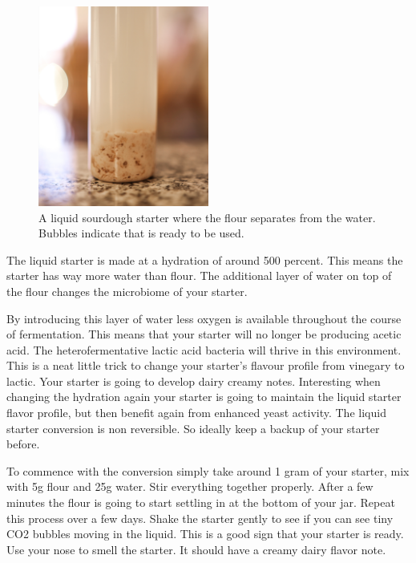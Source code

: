 \begin{figure}[!htb]
  \centering
  \includegraphics[width=0.5\textwidth]{sourdough-starter-liquid.jpg}
  \caption{A liquid sourdough starter where the flour separates from the water. Bubbles indicate
  that is ready to be used.}
  \label{fig:liquid-sourdough-starter}
\end{figure}

The liquid starter is made at a hydration of around 500 percent. This means
the starter has way more water than flour. The additional layer of water on
top of the flour changes the microbiome of your starter.

By introducing this layer of water less oxygen is available throughout the
course of fermentation. This means that your starter will no longer be
producing acetic acid. The heterofermentative lactic acid bacteria will thrive
in this environment. This is a neat little trick to change your starter's
flavour profile from vinegary to lactic. Your starter is going to develop
dairy creamy notes. Interesting when changing the hydration again your starter
is going to maintain the liquid starter flavor profile, but then benefit again
from enhanced yeast activity. The liquid starter conversion is non reversible.
So ideally keep a backup of your starter before.

To commence with the
conversion simply take around 1 gram of your starter, mix with 5g flour and
25g water. Stir everything together properly. After a few minutes the flour is
going to start settling in at the bottom of your jar. Repeat this process over
a few days. Shake the starter gently to see if you can see tiny CO2 bubbles
moving in the liquid. This is a good sign that your starter is ready. Use your
nose to smell the starter. It should have a creamy dairy flavor note.

